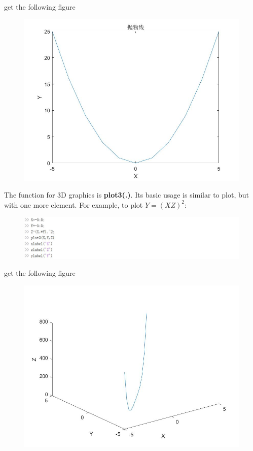 \documentclass[10pt,math=newtx,citestyle=gb7714-2015,bibstyle=gb7714-2015]{elegantbook}
\begin{document}
{{{	get the following figure
	\begin{figure}[htbp!]
		\centering
		\includegraphics[width=0.8\linewidth]{FIG/XY1.jpg}
		\centering
	\end{figure}
	
	The function for 3D graphics is \textbf{plot3(.)}. Its basic usage is similar to plot, but with one more element. For example, to plot $Y=(XZ)^2$:
	\begin{figure}[htbp!]
		\centering
		\includegraphics[width=0.8\linewidth]{FIG/3D.jpg}
		\centering
	\end{figure}
	
	get the following figure
	\begin{figure}[htbp!]
		\centering
		\includegraphics[width=0.8\linewidth]{FIG/3Dplot.jpg}
		\centering
	\end{figure}
	
}}}
\end{document}
